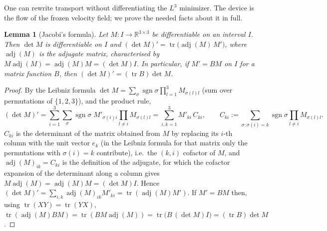 \documentclass[11pt]{article}
\newtheorem{lemma}[theorem]{Lemma}
\theoremstyle{definition}
\theoremstyle{plain}
\newcommand{\R}{\mathbb R}
\begin{document}
One can rewrite transport without differentiating the $L^3$ minimizer.
The device is the flow of the frozen velocity field; we prove the needed
facts about it in full.

\begin{lemma}[Jacobi's formula]\label{lem:qe-jacobi}
Let $M:I\to\R^{3\times3}$ be differentiable on an interval $I$.  Then
$\det M$ is differentiable on $I$ and
$(\det M)'=\operatorname{tr}\bigl(\operatorname{adj}(M)\,M'\bigr)$, where
$\operatorname{adj}(M)$ is the adjugate matrix, characterised by
$M\operatorname{adj}(M)=\operatorname{adj}(M)M=(\det M)I$.  In particular,
if $M'=BM$ on $I$ for a matrix function $B$, then
$(\det M)'=(\operatorname{tr}B)\det M$.
\end{lemma}

\begin{proof}
By the Leibniz formula $\det M=\sum_\sigma\operatorname{sgn}\sigma\prod_{l=1}^3M_{\sigma(l)l}$
(sum over permutations of $\{1,2,3\}$), and the product rule,
\[
 (\det M)'=\sum_{i=1}^3\sum_\sigma\operatorname{sgn}\sigma\;M'_{\sigma(i)i}\prod_{l\ne i}M_{\sigma(l)l}
 =\sum_{i,k=1}^3M'_{ki}\,C_{ki},
 \qquad
 C_{ki}:=\sum_{\sigma:\sigma(i)=k}\operatorname{sgn}\sigma\prod_{l\ne i}M_{\sigma(l)l}.
\]
$C_{ki}$ is the determinant of the matrix obtained from $M$ by replacing
its $i$-th column with the unit vector $e_k$ (in the Leibniz formula for
that matrix only the permutations with $\sigma(i)=k$ contribute), i.e.\ the
$(k,i)$ cofactor of $M$, and $\operatorname{adj}(M)_{ik}=C_{ki}$ is the
definition of the adjugate, for which the cofactor expansion of the
determinant along a column gives $M\operatorname{adj}(M)=\operatorname{adj}(M)M=(\det M)I$.  Hence
$(\det M)'=\sum_{i,k}\operatorname{adj}(M)_{ik}M'_{ki}=\operatorname{tr}(\operatorname{adj}(M)M')$.
If $M'=BM$ then, using $\operatorname{tr}(XY)=\operatorname{tr}(YX)$,
$\operatorname{tr}(\operatorname{adj}(M)BM)=\operatorname{tr}(BM\operatorname{adj}(M))
=\operatorname{tr}\bigl(B\,(\det M)I\bigr)=(\operatorname{tr}B)\det M$.
\end{proof}
\end{document}

